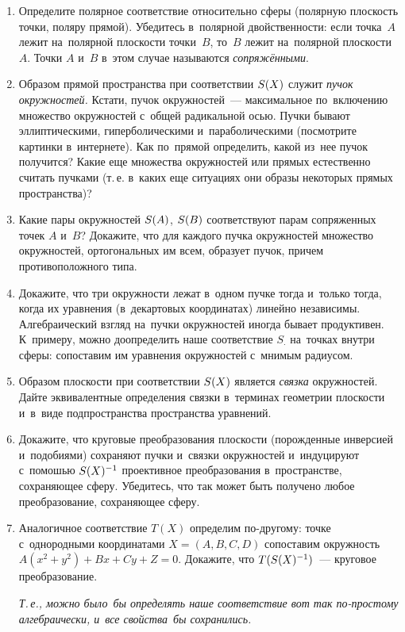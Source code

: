 \begin{enumerate}

\item
Определите полярное соответствие относительно сферы
(полярную плоскость точки, поляру прямой).
Убедитесь в~полярной двойственности: если точка~$A$ лежит на~полярной плоскости
точки~$B$, то~$B$ лежит на~полярной плоскости $A$.
Точки $A$ и~$B$ в~этом случае называются \emph{сопряжёнными}.

\item
Образом прямой пространства при соответствии $S(X)$ служит
\emph{пучок окружностей.}
Кстати, пучок окружностей~--- максимальное по~включению множество окружностей
с~общей радикальной осью.
Пучки бывают эллиптическими, гиперболическими и~параболическими
(посмотрите картинки в~интернете).
Как по~прямой определить, какой из~нее пучок получится?
Какие еще множества окружностей или прямых естественно считать пучками
(т.\,е. в~каких еще ситуациях они образы некоторых прямых пространства)?

\item
Какие пары окружностей $S(A)$, $S(B)$ соответствуют парам
сопряженных точек $A$ и~$B$?
Докажите, что для каждого пучка окружностей множество окружностей,
ортогональных им всем, образует пучок, причем противоположного типа.

\item
Докажите, что три окружности лежат в~одном пучке тогда и~только тогда, когда их
уравнения (в~декартовых координатах) линейно независимы.
Алгебраический взгляд на~пучки окружностей иногда бывает продуктивен.
К~примеру, можно доопределить наше соответствие $S_{\cdot}$ на~точках внутри
сферы: сопоставим им уравнения окружностей с~мнимым радиусом.

\item
Образом плоскости при соответствии $S(X)$ является
\emph{связка} окружностей.
Дайте эквивалентные определения связки в~терминах геометрии плоскости и~в~виде
подпространства пространства уравнений.

\item
Докажите, что круговые преобразования плоскости (порожденные инверсией
и~подобиями) сохраняют пучки и~связки окружностей и~индуцируют с~помошью
$S(X)^{-1}$ проективное преобразования в~пространстве, сохраняющее
сферу.
Убедитесь, что так может быть получено любое преобразование, сохраняющее сферу.

\item
Аналогичное соответствие $T(X)$ определим по-другому:
точке с~однородными координатами $X = (A, B, C ,D)$ сопоставим
окружность $A(x^2 + y^2) + Bx + Cy + Z = 0$.
Докажите, что $T( S(X)^{-1} )$~--- круговое преобразование.
\par
\emph{Т.\,е., можно было~бы определять наше соответствие вот так по-простому
алгебраически, и~все свойства~бы сохранились.}

\end{enumerate}

\endgroup %

